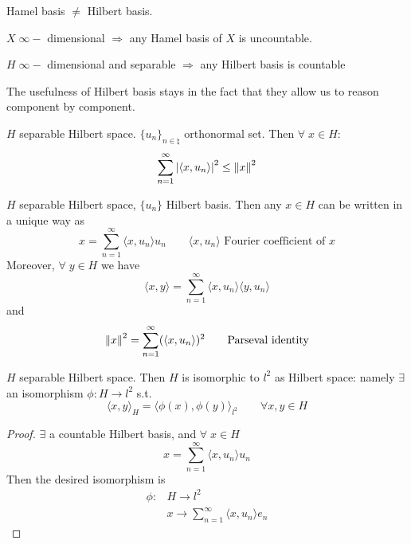 \begin{remark}
    Hamel basis \(\neq\) Hilbert basis.

    \(X \; \infty-\) dimensional \(\Rightarrow\) any Hamel basis of \(X\) is uncountable.

    \(H \; \infty-\) dimensional and separable \(\Rightarrow\) any Hilbert basis is countable
\end{remark}

The usefulness of Hilbert basis stays in the fact that they allow us to reason component by component.

\begin{theorem}
    \(H\) separable Hilbert space. \(\{u_n\}_{n \in \natural}\) orthonormal set. Then \(\forall \; x \in H\):
    \[
        \sum_{n=1}^\infty \abs{\langle x, u_n\rangle }^2 \leq \norm{x}^2
    \]
\end{theorem}
\begin{theorem}
    \(H\) separable Hilbert space, \(\{u_n\}\) Hilbert basis.
    Then any \(x \in H\) can be written in a unique way as 
    \[
        x = \sum_{n=1}^\infty \langle x, u_n\rangle   u_n \qquad \langle x, u_n\rangle   \text{ Fourier coefficient of }x
    \]
    Moreover, \(\forall\; y \in H\) we have
    \[
        \langle x, y\rangle   = \sum_{n=1}^\infty \langle x, u_n\rangle   \langle y, u_n \rangle  
    \]
    and 
    \[
        \norm{x}^2 = \sum_{n=1}^\infty (\langle x, u_n\rangle  )^2 \tag*{Parseval identity}
    \]
\end{theorem}
\begin{theorem}
    \(H\) separable Hilbert space. Then \(H\) is isomorphic to \(l^2\) as Hilbert space: namely \(\exists\) an isomorphism \(\phi: H \to l^2\) s.t.
    \[
        \langle x, y\rangle  _H = \langle \phi(x), \phi(y)\rangle  _{l^2} \qquad \forall x, y \in H
    \]
\end{theorem}
\begin{proof}
    \(\exists\) a countable Hilbert basis, and \(\forall\; x \in H\)
    \[
        x = \sum_{n=1}^\infty \langle x, u_n\rangle   u_n
    \]
    Then the desired isomorphism is
    \[
        \begin{array}{rl}
            \phi: & H \to l^2 \\
            & x \to \sum_{n=1}^\infty \langle x, u_n\rangle   e_n
        \end{array}
    \]
\end{proof}

